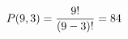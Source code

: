 \documentclass[preview]{standalone}
\begin{document}
\begin{align*}
\special{dvisvgm:raw <g id='unique000'>}P(9,3) = \frac{9!}{(9-3)!} = 84\special{dvisvgm:raw </g>}
\end{align*}
\end{document}
